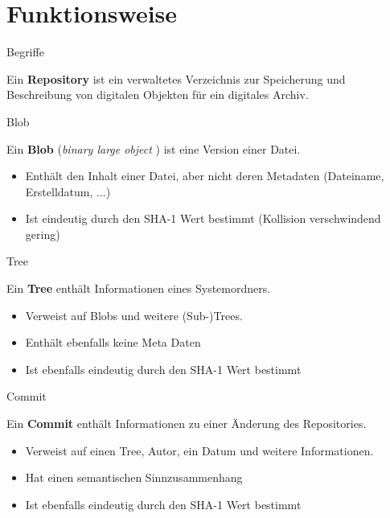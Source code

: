 \section{Funktionsweise}

\begin{frame}{Begriffe}
  \begin{Definition}
    Ein \textbf{Repository} ist ein verwaltetes Verzeichnis zur Speicherung und Beschreibung von digitalen Objekten für ein digitales Archiv.\cite{WREP}
  \end{Definition}
\end{frame}

\begin{frame}{Blob}
  \begin{Definition}
    Ein \textbf{Blob} (\glqq \textit{binary large object} \grqq ) ist eine Version einer Datei.
  \end{Definition}
  \begin{itemize}
    \pause
    \item Enthält den Inhalt einer Datei, aber nicht deren Metadaten (Dateiname, Erstelldatum, ...)
    \pause
    \item Ist eindeutig durch den SHA-1 Wert bestimmt (Kollision verschwindend gering)
  \end{itemize}
\end{frame}

\begin{frame}{Tree}
  \begin{Definition}
    Ein \textbf{Tree} enthält Informationen eines Systemordners.
  \end{Definition}
  \begin{itemize}
    \pause
    \item Verweist auf Blobs und weitere (Sub-)Trees.
    \pause
    \item Enthält ebenfalls keine Meta Daten
    \pause
    \item Ist ebenfalls eindeutig durch den SHA-1 Wert bestimmt
  \end{itemize}
\end{frame}

\begin{frame}{Commit}
  \begin{Definition}
    Ein \textbf{Commit} enthält Informationen zu einer Änderung des Repositories.
  \end{Definition}
  \begin{itemize}
    \pause
    \item Verweist auf einen Tree, Autor, ein Datum und weitere Informationen.
    \pause
    \item Hat einen semantischen Sinnzusammenhang
    \pause
    \item Ist ebenfalls eindeutig durch den SHA-1 Wert bestimmt
  \end{itemize}
\end{frame}

